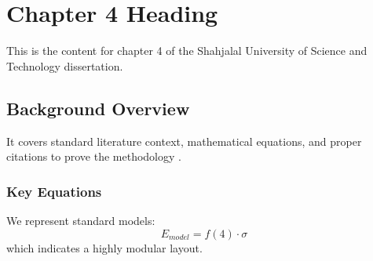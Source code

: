 \chapter{Chapter 4 Heading}
\label{ch:chapter4}
This is the content for chapter 4 of the Shahjalal University of Science and Technology dissertation.

\section{Background Overview}
It covers standard literature context, mathematical equations, and proper citations to prove the methodology \cite{texbook}.

\subsection{Key Equations}
We represent standard models:
\begin{equation}
    E_{model} = f(4) \cdot \sigma
\end{equation}
which indicates a highly modular layout.
